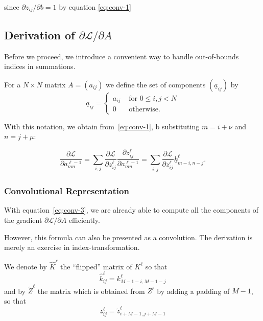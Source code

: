 \documentclass[a4paper,10pt]{article}
\def\Loss{\mathcal{L}}
\begin{document}
since $\partial z_{ij} / \partial b = 1$ by equation \ref{eq:conv-1}

\subsection*{Derivation of $\partial \Loss / \partial A$}

\def\ov#1{\underline{#1}}

Before we proceed, we introduce a convenient way to handle out-of-bounds indices in summations. 

For a $N \times N$ matrix $A = (a_{ij})$ we define the set of components $(\ov{a}_{ij})$ by
\[
   \ov a_{ij} = \left\{ 
        \begin{array}{ll} 
            a_{ij} &\text{ for }0 \le i,j < N \\
            0      &\text{ otherwise}.
        \end{array}
        \right.   
\]
 
With this notation, we obtain from~\ref{eq:conv-1}, b substituting $m=i +\nu$ and $n = j + \mu$: 

\begin{equation}
    \label{eq:conv-3}
    \boxed{
        \frac{\partial \Loss}{\partial a^{\ell-1}_{mn}} = 
        \sum_{i,j} \frac{\partial \Loss}{\partial z_{ij}^\ell} 
        \frac{\partial z_{ij}^\ell}{\partial a_{mn}^{\ell-1}} = 
        \sum_{\substack{i,j}} \frac{\partial \Loss}{\partial z_{ij}^\ell} \ov{k}_{m-i, n-j}^{\ell}.
        }
\end{equation}

\subsubsection*{Convolutional Representation}

\def\flip#1{\widehat{#1}}
\def\pad#1{\widetilde{#1}}


With equation~\ref{eq:conv-3}, we are already able to compute all the
components of the gradient $\partial \Loss / \partial A$ efficiently.

However, this formula can also be presented as a convolution. The derivation is
merely an exercise in index-transformation.

We denote by $\flip K^\ell$ the ``flipped'' matrix of $K^\ell$ so that 
\[
    \flip k^\ell_{ij} = k^\ell_{M-1-i, M-1-j}
\]
and by $\pad Z^\ell $ the matrix which is obtained from $Z^\ell$ by adding
a padding of $M-1$, so that
\[
    z_{ij}^\ell = \pad z^\ell_{i+M-1, j+M-1}
\]
\end{document}
